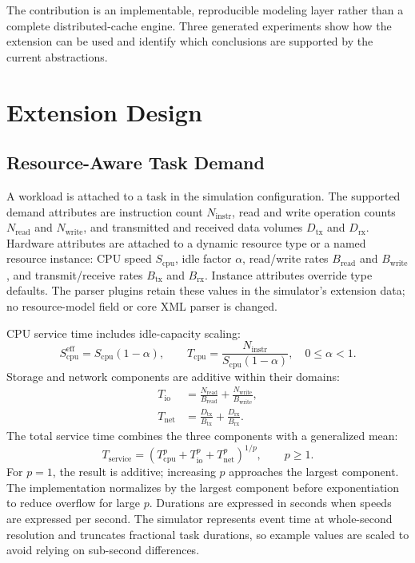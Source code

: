 \documentclass[conference]{IEEEtran}
\begin{document}
The contribution is an implementable, reproducible modeling layer rather than a complete distributed-cache engine.
Three generated experiments show how the extension can be used and identify which conclusions are supported by the
current abstractions.

\section{Extension Design}

\subsection{Resource-Aware Task Demand}

A workload is attached to a task in the simulation configuration. The supported demand attributes are instruction
count $N_{\mathrm{instr}}$, read and write operation counts $N_{\mathrm{read}}$ and $N_{\mathrm{write}}$, and transmitted
and received data volumes $D_{\mathrm{tx}}$ and $D_{\mathrm{rx}}$. Hardware attributes are attached to a dynamic
resource type or a named resource instance: CPU speed $S_{\mathrm{cpu}}$, idle factor $\alpha$, read/write rates
$B_{\mathrm{read}}$ and $B_{\mathrm{write}}$, and transmit/receive rates $B_{\mathrm{tx}}$ and $B_{\mathrm{rx}}$.
Instance attributes override type defaults. The parser plugins retain these values in the simulator's extension data;
no resource-model field or core XML parser is changed.

CPU service time includes idle-capacity scaling:
\begin{equation}
S_{\mathrm{cpu}}^{\mathrm{eff}} = S_{\mathrm{cpu}}(1-\alpha), \qquad
T_{\mathrm{cpu}} = \frac{N_{\mathrm{instr}}}{S_{\mathrm{cpu}}(1-\alpha)}, \quad 0\leq\alpha<1.
\end{equation}
Storage and network components are additive within their domains:
\begin{align}
T_{\mathrm{io}} &= \frac{N_{\mathrm{read}}}{B_{\mathrm{read}}}+
                    \frac{N_{\mathrm{write}}}{B_{\mathrm{write}}},\\
T_{\mathrm{net}} &= \frac{D_{\mathrm{tx}}}{B_{\mathrm{tx}}}+
                     \frac{D_{\mathrm{rx}}}{B_{\mathrm{rx}}}.
\end{align}
The total service time combines the three components with a generalized mean:
\begin{equation}
T_{\mathrm{service}} = \left(T_{\mathrm{cpu}}^p+T_{\mathrm{io}}^p+T_{\mathrm{net}}^p\right)^{1/p},
\qquad p\geq 1.
\label{eq:softmax}
\end{equation}
For $p=1$, the result is additive; increasing $p$ approaches the largest component. The implementation normalizes by
the largest component before exponentiation to reduce overflow for large $p$. Durations are expressed in seconds when
speeds are expressed per second. The simulator represents event time at whole-second resolution and truncates
fractional task durations, so example values are scaled to avoid relying on sub-second differences.
\end{document}

